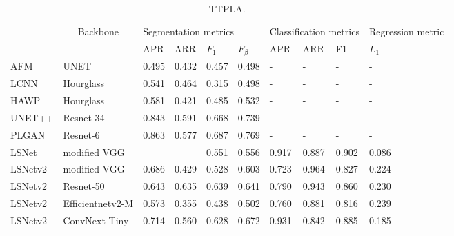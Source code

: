 \documentclass[journal]{IEEEtran}
\begin{document}
\begin{table}[]
  \begin{tabular}{l|l|llll|lll|l}
  \hline
          & \multicolumn{1}{c|}{\multirow{2}{*}{Backbone}} & \multicolumn{4}{l|}{Segmentation metrics} & \multicolumn{3}{l|}{Classification metrics} & Regression metric \\ \cline{3-10} 
          & \multicolumn{1}{c|}{}                          & APR      & ARR      & $F_1$       & $F_{\beta}$    & APR           & ARR          & F1           & $L_1$          \\ \hline
  AFM     & UNET                                           & 0.495    & 0.432    & 0.457       & 0.498          & -             & -            & -            & -              \\
  LCNN    & Hourglass                                      & 0.541    & 0.464    & 0.315       & 0.498          & -             & -            & -            & -              \\
  HAWP    & Hourglass                                      & 0.581    & 0.421    & 0.485       & 0.532          & -             & -            & -            & -              \\
  UNET++  & Resnet-34                                      & 0.843    & 0.591    & 0.668       & 0.739          & -             & -            & -            & -              \\ 
  PLGAN   & Resnet-6                                       & 0.863    & 0.577    & 0.687       & 0.769          & -             & -            & -            & -              \\ \hline
  LSNet   & modified VGG                                   &     &     & 0.551        & 0.556          & 0.917         & 0.887        & 0.902        & 0.086          \\
  LSNetv2 & modified VGG                                   & 0.686    & 0.429    & 0.528       & 0.603          & 0.723         & 0.964        & 0.827        & 0.224          \\
  LSNetv2 & Resnet-50                                      & 0.643    & 0.635    & 0.639       & 0.641          & 0.790         & 0.943        & 0.860        & 0.230          \\
  LSNetv2 & Efficientnetv2-M                               & 0.573    & 0.355    & 0.438       & 0.502          & 0.760         & 0.881        & 0.816        & 0.239          \\
  LSNetv2 & ConvNext-Tiny                                  & 0.714    & 0.560    & 0.628       & 0.672          & 0.931         & 0.842        & 0.885        & 0.185            
  \end{tabular}
  \caption{\label{ttpla_table} TTPLA.}
\end{table}
\end{document}
